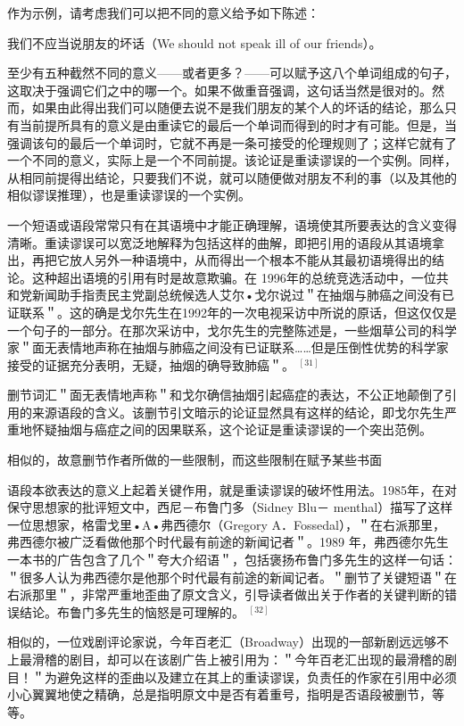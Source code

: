 作为示例，请考虑我们可以把不同的意义给予如下陈述：

我们不应当说朋友的坏话（We should not speak ill of our friends）。

至少有五种截然不同的意义——或者更多？——可以赋予这八个单词组成的句子，这取决于强调它们之中的哪一个。如果不做重音强调，这句话当然是很对的。然而，如果由此得出我们可以随便去说不是我们朋友的某个人的坏话的结论，那么只有当前提所具有的意义是由重读它的最后一个单词而得到的时才有可能。但是，当强调该句的最后一个单词时，它就不再是一条可接受的伦理规则了；这样它就有了一个不同的意义，实际上是一个不同前提。该论证是重读谬误的一个实例。同样，从相同前提得出结论，只要我们不说，就可以随便做对朋友不利的事（以及其他的相似谬误推理），也是重读谬误的一个实例。

一个短语或语段常常只有在其语境中才能正确理解，语境使其所要表达的含义变得清晰。重读谬误可以宽泛地解释为包括这样的曲解，即把引用的语段从其语境拿出，再把它放人另外一种语境中，从而得出一个根本不能从其最初语境得出的结论。这种超出语境的引用有时是故意欺骗。在 1996年的总统竞选活动中，一位共和党新闻助手指责民主党副总统候选人艾尔•戈尔说过＂在抽烟与肺癌之间没有已证联系＂。这的确是戈尔先生在1992年的一次电视采访中所说的原话，但这仅仅是一个句子的一部分。在那次采访中，戈尔先生的完整陈述是，一些烟草公司的科学家＂面无表情地声称在抽烟与肺癌之间没有已证联系……但是压倒性优势的科学家接受的证据充分表明，无疑，抽烟的确导致肺癌＂。 ${ }^{[31]}$

删节词汇＂面无表情地声称＂和戈尔确信抽烟引起癌症的表达，不公正地颠倒了引用的来源语段的含义。该删节引文暗示的论证显然具有这样的结论，即戈尔先生严重地怀疑抽烟与癌症之间的因果联系，这个论证是重读谬误的一个突出范例。

相似的，故意删节作者所做的一些限制，而这些限制在赋予某些书面

语段本欲表达的意义上起着关键作用，就是重读谬误的破坏性用法。1985年，在对保守思想家的批评短文中，西尼－布鲁门多（Sidney Blu－ menthal）描写了这样一位思想家，格雷戈里•A•弗西德尔（Gregory A．Fossedal），＂在右派那里，弗西德尔被广泛看做他那个时代最有前途的新闻记者＂。1989 年，弗西德尔先生一本书的广告包含了几个＂夸大介绍语＂，包括褒扬布鲁门多先生的这样一句话：＂很多人认为弗西德尔是他那个时代最有前途的新闻记者。＂删节了关键短语＂在右派那里＂，非常严重地歪曲了原文含义，引导读者做出关于作者的关键判断的错误结论。布鲁门多先生的恼怒是可理解的。 ${ }^{[32]}$

相似的，一位戏剧评论家说，今年百老汇（Broadway）出现的一部新剧远远够不上最滑稽的剧目，却可以在该剧广告上被引用为：＂今年百老汇出现的最滑稽的剧目！＂为避免这样的歪曲以及建立在其上的重读谬误，负责任的作家在引用中必须小心翼翼地使之精确，总是指明原文中是否有着重号，指明是否语段被删节，等等。

